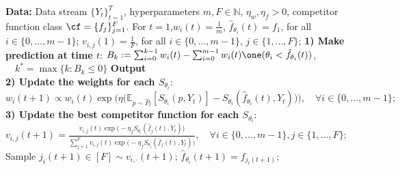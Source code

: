     
\begin{algorithm}
    \caption{Two-player game based single quantile omniprediction (fully online version)} \label{alg:omni-twoplayer_online_q}
    \begin{algorithmic}[1]
    \State \textbf{Data:} Data stream $\{Y_t\}_{t=1}^T$, hyperparameters $m, F \in \mathbb{N}$, $\eta_w, \eta_f > 0$, competitor function class $\cf = \{f_j\}_{j=1}^{F}$.
    \State For $t=1$,$w_i(t) = \frac{1}{m}$, $\hat{f}_{\theta_i}(t) = f_1$, for all $i \in \{0, \ldots, m-1\}$;
    \State $v_{i,j}(1) = \frac{1}{F}$, for all $i \in \{0, \ldots, m-1\}$, $j \in \{1, \ldots, F\}$;
      \State \textbf{1) Make prediction at time $t$}:
      \State $B_k := \sum_{i=0}^{k-1} w_i(t) - \sum_{i=0}^{m-1}w_i(t) \one(\theta_i < \hat{f}_{\theta_i}(t))$, $\quad k^* = \max\{k: B_k \leq 0\}$
        \State \textbf{Output}
         \vspace{-0.1cm}\\
        \State \textbf{2) Update the weights for each $S_{\theta_i}$}:
            \State $w_i(t+1) \propto w_i(t) \exp\bigl(\eta \big(\mathbb{E}_{p \sim \hat{P}_t}[S_{\theta_i}(p, Y_t)] 
            - S_{\theta_i}(\hat{f}_{\theta_i}(t), Y_t)\big)\bigr), \quad \forall i \in \{0, \ldots, m-1\};$ \vspace{-0.1cm}\\
        \State \textbf{3) Update the best competitor function for each $S_{\theta_i}$}:
        \State $v_{i,j}(t+1) = \frac{v_{i,j}(t) \exp\bigl(-\eta_f S_{\theta_i}(\hat{f}_{j}(t), Y_t)\bigr)}{\sum_{j=1}^F v_{i,j}(t) \exp\bigl(-\eta_f S_{\theta_i}(\hat{f}_{j}(t), Y_t)\bigr)}, \quad \forall i \in \{0, \ldots, m-1\}, j \in \{1, \ldots, F\};$
          \State Sample $j_i(t+1) \in [F] \sim v_{i,\cdot}(t+1)$;
          \State $\hat{f}_{\theta_i}(t+1) = f_{j_i(t+1)}$;
        \EndFor
    \EndFor
    \end{algorithmic}
    \end{algorithm}
    
